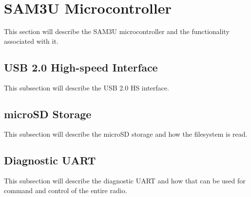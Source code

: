 \section{SAM3U Microcontroller} %
\label{sec:sam3u}
    This section will describe the SAM3U microcontroller and the functionality associated with it.
    
    \subsection{USB 2.0 High-speed Interface} %
        This subsection will describe the USB 2.0 HS interface.
    
    \subsection{microSD Storage} %
        This subsection will describe the microSD storage and how the filesystem is read.
    
    \subsection{Diagnostic UART} %
        This subsection will describe the diagnostic UART and how that can be used for command
        and control of the entire radio.
